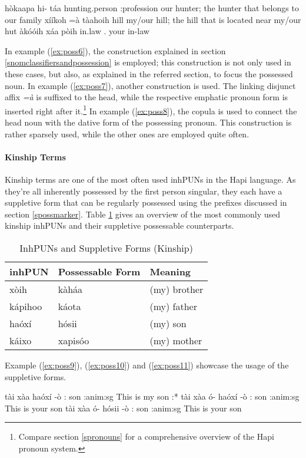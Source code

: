 \documentclass[a4paper, 12pt, oneside]{memoir}
\newcommand{\emh}[1]{\textit{#1}}
\begin{document}
\begin{examples}
\ex 
\label{ex:poss6}
\bits hòkaapa hi- táa
\gloss hunting.person {\Fpposs} {\Cl}:profession
\tr our hunter; the hunter that belongs to our family
\ex
\label{ex:poss7}
\bits xííkoh =à tàahoih
\gloss hill {\Link} {\Ff}
\tr my/our hill; the hill that is located near my/our hut
\ex
\label{ex:poss8}
\bits àkóóih xáa pòih
\gloss in.law {\Cop} {\Ss}.{\Dat}
\tr your in-law
\end{examples}
In example (\ref{ex:poss6}), the construction explained in section \ref{snomclassifiersandpossession} is employed; this construction is not only used in these cases, but also, as explained in the referred section, to focus the possessed noun. In example (\ref{ex:poss7}), another construction is used. The linking disjunct affix \emh{=à} is suffixed to the head, while the respective emphatic pronoun form is inserted right after it.\footnote{Compare section \ref{spronouns} for a comprehensive overview of the Hapi pronoun system.}
In example (\ref{ex:poss8}), the copula is used to connect the head noun with the dative form of the possessing pronoun. This construction is rather sparsely used, while the other ones are employed quite often. 
\paragraph{Kinship Terms}
Kinship terms are one of the most often used inhPUNs in the Hapi language. As they're all inherently possessed by the first person singular, they each have a suppletive form that can be regularly possessed using the prefixes discussed in section \ref{spossmarker}. Table \ref{t:kinship} gives an overview of the most commonly used kinship inhPUNs and their suppletive possessable counterparts. 
\begin{table}[H]
\centering
\begin{tabular}{@{}lll@{}}
\toprule
inhPUN & Possessable Form & Meaning \\ \midrule
xòih & kàháa & (my) brother \\
kápihoo & káota & (my) father \\
haóxí & hósii & (my) son \\
káixo & xapisóo & (my) mother \\ \bottomrule
\end{tabular}
\caption{InhPUNs and Suppletive Forms (Kinship)}
\label{t:kinship}
\end{table}
Example (\ref{ex:poss9}), (\ref{ex:poss10}) and (\ref{ex:poss11}) showcase the usage of the suppletive forms. 
\begin{examples}
\ex
\label{ex:poss9}
\bits tài xàa haóxí -ò
\gloss {\Dem}:{\Prox} {\Cop} son {\Cl}:anim:sg
\tr This is my son
\ex
\label{ex:poss10}
\bits:* tài xàa ó- haóxí -ò
\gloss {\Dem}:{\Prox} {\Cop} {\Ssposs} son {\Cl}:anim:sg
\intended This is your son
\ex
\label{ex:poss11}
\bits tài xàa ó- hósii -ò
\gloss {\Dem}:{\Prox} {\Cop} {\Ssposs} son {\Cl}:anim:sg
\tr This is your son
\end{examples}
\end{document}

